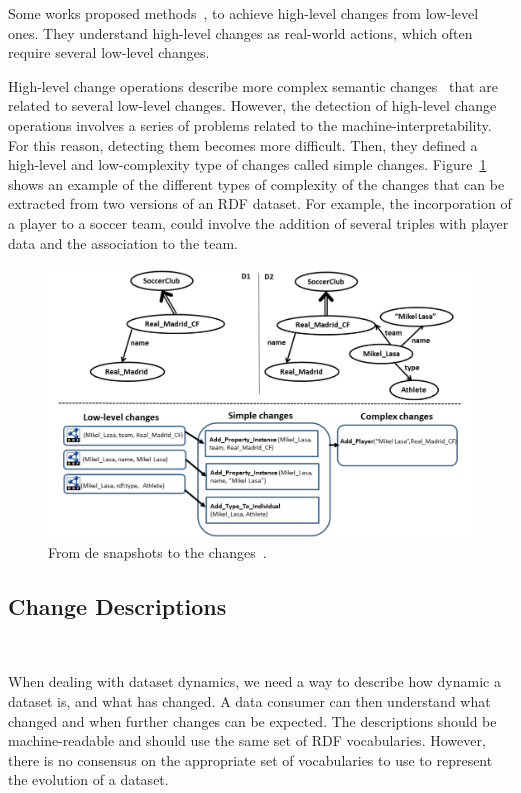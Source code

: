 \documentclass[sw]{iosart2x}
\begin{document}
Some works proposed methods~\cite{PapavasileiouFFKC13}, \cite{RoussakisCSFS15} to achieve high-level changes from low-level ones. They understand high-level changes as real-world actions, which often require several low-level changes.

High-level change operations describe more complex semantic changes~\cite{RoussakisCSFS15} that are related to several low-level changes. However, the detection of high-level change operations involves a series of problems related to the machine-interpretability. For this reason, detecting them becomes more difficult. Then, they defined a high-level and low-complexity type of changes called simple changes. Figure~\ref{fig:cd} shows an example of the different types of complexity of the changes that can be extracted from two versions of an RDF dataset. For example, the incorporation of a player to a soccer team, could involve the addition of several triples with player data and the association to the team.

\begin{figure}[h]
	\centering
	\includegraphics[scale=0.3]{img/cd.png}
	\caption{From de snapshots to the changes~\cite{RoussakisCSFS15}.}
	\label{fig:cd}
\end{figure}

\subsection{Change Descriptions}\label{Descriptions}
~\cite{PopitschHR10,UmbrichVH10,SandersonS12,MeimarisP16}

When dealing with dataset dynamics, we need a way to describe how dynamic a dataset is, and what has changed. A data consumer can then understand what changed and when further changes can be expected. The descriptions should be machine-readable and should use the same set of RDF vocabularies. However, there is no consensus on the appropriate set of vocabularies to use to represent the evolution of a dataset. 
\end{document}
